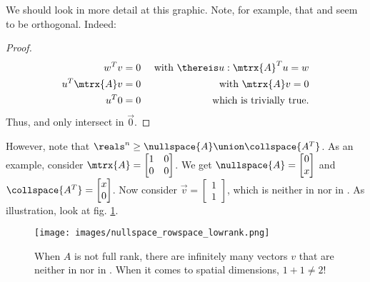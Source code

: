 We should look in more detail at this graphic. Note, for example, that  and  seem to be orthogonal. Indeed:
\begin{theorem}
\end{theorem}
\begin{proof}
    \begin{equation}
        \begin{aligned}
            w^T v &= 0  & \text{ with } \thereis u: \mtrx{A}^T u = w \\
            u^T \mtrx{A} v &= 0 & \text{ with } \mtrx{A}v = 0 \\
            u^T 0 &= 0 & \text{ which is trivially true.}
        \end{aligned}
    \end{equation}
    Thus,  and  only intersect in $\vec{0}$.
\end{proof}

However, note that $\reals^n \geq \nullspace{A} \union \collspace{A^T}$. As an example, consider $\mtrx{A} = \begin{bmatrix}
    1 & 0 \\
    0 & 0
\end{bmatrix}$. We get $\nullspace{A} = \begin{bmatrix}
    0 \\ x
\end{bmatrix}$ and $\collspace{A^T} = \begin{bmatrix}
    x \\ 0
\end{bmatrix}$. Now consider $\vec{v} = \begin{bmatrix}
    1 \\ 1
\end{bmatrix}$, which is neither in  nor in . As illustration, look at fig. \ref{nullspace_rowspace_lowrank}.

\begin{figure}[H] \label{nullspace_rowspace_lowrank}
    \caption{When $A$ is not full rank, there are infinitely many vectors $v$ that are neither in  nor in . When it comes to spatial dimensions, $1 + 1 \neq 2$!}
    \centering
    \texttt{[image: images/nullspace\_rowspace\_lowrank.png]}
\end{figure}





